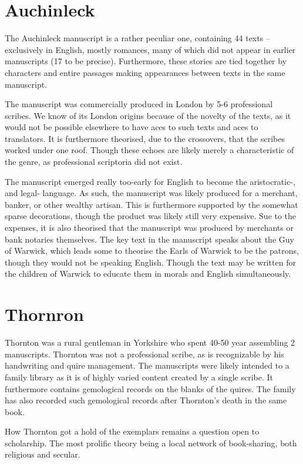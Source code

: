 \documentclass[12pt]{report}
\begin{document}
\section{Auchinleck}
The Auchinleck manuscript is a rather peculiar one, containing 44 texts --
exclusively in English, mostly romances, many of which did not appear in earlier
manuscripts (17 to be precise). Furthermore, these stories are tied together by
characters and entire passages making appearances between texts in the same
manuscript.

The manuscript was commercially produced in London by 5-6 professional scribes.
We know of its London origins because of the novelty of the texts, as it would
not be possible elsewhere to have aces to such texts and aces to translators. It
is furthermore theorised, due to the crossovers, that the scribes worked under
one roof. Though these echoes are likely merely a characteristic of the genre,
as professional scriptoria did not exist.

The manuscript emerged really too-early for English to become the aristocratic-,
and legal- language. As such, the manuscript was likely produced for a merchant,
banker, or other wealthy artisan. This is furthermore supported by the somewhat
sparse decorations, though the product was likely still very expensive. Sue to
the expenses, it is also theorised that the manuscript was produced by merchants
or bank notaries themselves.  The key text in the manuscript speaks about the
Guy of Warwick, which leads some to theorise the Earls of Warwick to be the
patrons, though they would not be speaking English. Though the text may be
written for the children of Warwick to educate them in morals and English
simultaneously.

\section{Thornron} Thornton was a rural gentleman in Yorkshire who spent 40-50
year assembling 2 manuscripts. Thornton was not a professional scribe, as is
recognizable by his handwriting and quire management. The manuscripts were
likely intended to a family library as it is of highly varied content created by
a single scribe. It furthermore contains gemological records on the blanks of
the quires. The family has also recorded such gemological records after
Thornton's death in the same book.

How Thornton got a hold of the exemplars remains a question open to scholarship.
The most prolific theory being a local network of book-sharing, both religious
and secular.
\end{document}
